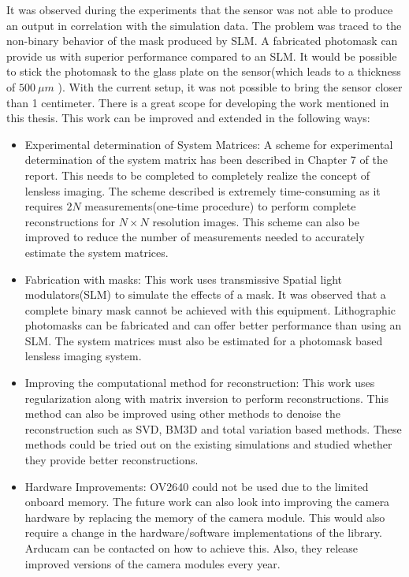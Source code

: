 It was observed during the experiments that the sensor was not able to produce an output in correlation with the simulation data. The problem was traced to the non-binary behavior of the mask produced by SLM. A fabricated photomask can provide us with superior performance compared to an SLM. It would be possible to stick the photomask to the glass plate on the sensor(which leads to a thickness of $500 \ \mu m$ ). With the current setup, it was not possible to bring the sensor closer than 1 centimeter. There is a great scope for developing the work mentioned in this thesis. This work can be improved and extended in the following ways:
\begin{itemize}
\item Experimental determination of System Matrices: A scheme for experimental determination of the system matrix has been described in Chapter 7 of the report. This needs to be completed to completely realize the concept of lensless imaging. The scheme described is extremely time-consuming as it requires $2N$ measurements(one-time procedure) to perform complete reconstructions for $N \times N$ resolution images. This scheme can also be improved to reduce the number of measurements needed to accurately estimate the system matrices. 

\item Fabrication with masks: This work uses transmissive Spatial light modulators(SLM) to simulate the effects of a mask. It was observed that a complete binary mask cannot be achieved with this equipment. Lithographic photomasks can be fabricated and can offer better performance than using an SLM. The system matrices must also be estimated for a photomask based lensless imaging system.

\item Improving the computational method for reconstruction: This work uses regularization along with matrix inversion to perform reconstructions. This method can also be improved using other methods to denoise the reconstruction such as SVD, BM3D and total variation based methods\cite{Flatcam}. These methods could be tried out on the existing simulations and studied whether they provide better reconstructions.

\item Hardware Improvements: OV2640 could not be used due to the limited onboard memory. The future work can also look into improving the camera hardware by replacing the memory of the camera module. This would also require a change in the hardware/software implementations of the library. Arducam can be contacted on how to achieve this. Also, they release improved versions of the camera modules every year.
\end{itemize}

